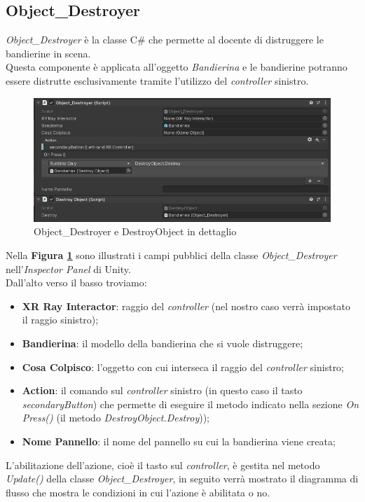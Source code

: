 \subsection{Object\_Destroyer}
\textit{Object\_Destroyer} è la classe C\# che permette al docente di distruggere le bandierine in scena.\\Questa componente è applicata all'oggetto \textit{Bandierina} e le bandierine potranno essere distrutte esclusivamente tramite l'utilizzo del \textit{controller} sinistro.
\begin{figure}[H]
    \centering
    \includegraphics[scale = 0.7]{Immagini/Object_destoryer.jpg}
    \caption{Object\_Destroyer e DestroyObject in dettaglio}
    \label{fig:4.7}
\end{figure}
\hspace{-0.6cm}Nella \textbf{Figura \ref{fig:4.7}} sono illustrati i campi pubblici della classe \textit{Object\_Destroyer} nell'\textit{Inspector Panel} di Unity.
\\Dall'alto verso il basso troviamo:
\begin{itemize}
    \item \textbf{XR Ray Interactor}: raggio del \textit{controller} (nel nostro caso verrà impostato il raggio sinistro);
    \item \textbf{Bandierina}: il modello della bandierina che si vuole distruggere;
    \item \textbf{Cosa Colpisco}: l'oggetto con cui interseca il raggio del \textit{controller} sinistro;
    \item \textbf{Action}: il comando sul \textit{controller} sinistro (in questo caso il tasto \textit{secondaryButton}) che permette di eseguire il metodo indicato nella sezione \textit{On Press()} (il metodo \textit{DestroyObject.Destroy}));
    \item \textbf{Nome Pannello}: il nome del pannello su cui la bandierina viene creata;
\end{itemize}
L'abilitazione dell'azione, cioè il tasto sul \textit{controller}, è gestita nel metodo \textit{Update()} della classe \textit{Object\_Destroyer}, in seguito verrà mostrato il diagramma di flusso che mostra le condizioni in cui l'azione è abilitata o no.
